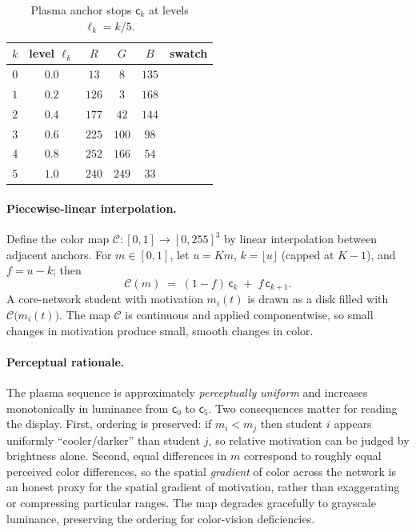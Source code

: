 \documentclass[11pt]{article}
\begin{document}
\begin{table}[h]
\centering
\renewcommand{\arraystretch}{1.15}
\begin{tabular}{cccccc}
\toprule
$k$ & level $\ell_k$ & $R$ & $G$ & $B$ & swatch \\
\midrule
$0$ & $0.0$ & $13$  & $8$   & $135$ & \cellcolor[RGB]{13,8,135}\hspace{2.4em} \\
$1$ & $0.2$ & $126$ & $3$   & $168$ & \cellcolor[RGB]{126,3,168}\hspace{2.4em} \\
$2$ & $0.4$ & $177$ & $42$  & $144$ & \cellcolor[RGB]{177,42,144}\hspace{2.4em} \\
$3$ & $0.6$ & $225$ & $100$ & $98$  & \cellcolor[RGB]{225,100,98}\hspace{2.4em} \\
$4$ & $0.8$ & $252$ & $166$ & $54$  & \cellcolor[RGB]{252,166,54}\hspace{2.4em} \\
$5$ & $1.0$ & $240$ & $249$ & $33$  & \cellcolor[RGB]{240,249,33}\hspace{2.4em} \\
\bottomrule
\end{tabular}
\caption{Plasma anchor stops $\mathsf{c}_k$ at levels $\ell_k = k/5$.}
\label{tab:stops}
\end{table}

\paragraph{Piecewise-linear interpolation.}
Define the color map $\mathcal{C}:[0,1]\to[0,255]^3$ by linear interpolation between adjacent anchors.
For $m\in[0,1]$, let $u = Km$, $k=\lfloor u\rfloor$ (capped at $K{-}1$), and $f = u-k$; then
\begin{equation}
  \mathcal{C}(m) \;=\; (1-f)\,\mathsf{c}_k \;+\; f\,\mathsf{c}_{k+1}.
  \label{eq:cmap}
\end{equation}
A core-network student with motivation $m_i(t)$ is drawn as a disk filled with
$\mathcal{C}\!\big(m_i(t)\big)$. The map $\mathcal{C}$ is continuous and applied componentwise,
so small changes in motivation produce small, smooth changes in color.

\paragraph{Perceptual rationale.}
The plasma sequence is approximately \emph{perceptually uniform} and increases monotonically in
luminance from $\mathsf{c}_0$ to $\mathsf{c}_5$. Two consequences matter for reading the display.
First, ordering is preserved: if $m_i < m_j$ then student $i$ appears uniformly ``cooler/darker''
than student $j$, so relative motivation can be judged by brightness alone. Second, equal
differences in $m$ correspond to roughly equal perceived color differences, so the spatial
\emph{gradient} of color across the network is an honest proxy for the spatial gradient of
motivation, rather than exaggerating or compressing particular ranges. The map degrades gracefully
to grayscale luminance, preserving the ordering for color-vision deficiencies.
\end{document}
